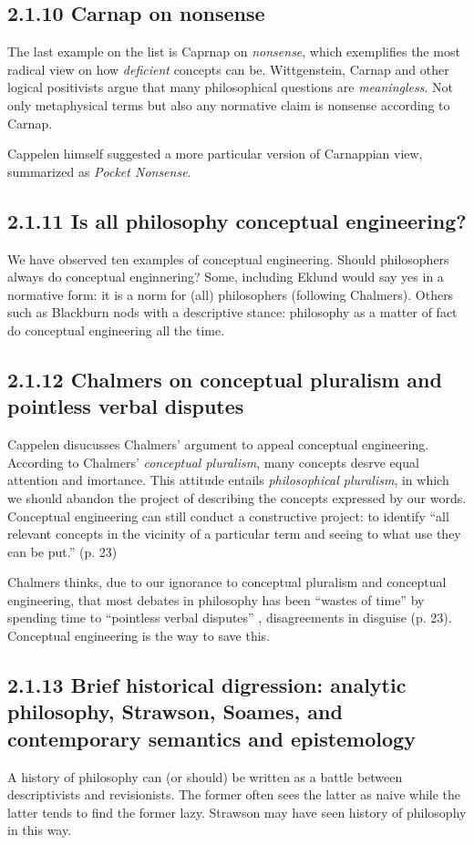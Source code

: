\documentclass[
10pt, %
a4paper, %
twocolumn, %
landscape %
]{article}
\begin{document}
\subsection*{2.1.10 Carnap on nonsense}
The last example on the list is Caprnap on \emph{nonsense}, which exemplifies the most radical view on how \emph{deficient} concepts can be. Wittgenstein, Carnap and other logical positivists argue that many philosophical questions are \emph{meaningless}. Not only metaphysical terms but also any normative claim is nonsense according to Carnap.

Cappelen himself suggested a more particular version of  Carnappian view, summarized as \emph{Pocket Nonsense}.

\subsection*{2.1.11 Is all philosophy conceptual engineering?}
We have observed ten examples of conceptual engineering. Should philosophers always do conceptual enginnering?
Some, including Eklund would say yes in a normative form: it is a norm for (all) philosophers (following Chalmers).
Others such as Blackburn nods with a descriptive stance: philosophy as a matter of fact do conceptual engineering all the time.

\subsection*{2.1.12 Chalmers on conceptual pluralism and pointless verbal disputes}
Cappelen disucusses Chalmers' argument to appeal conceptual engineering.
According to Chalmers' \emph{conceptual pluralism}, many concepts desrve equal attention and imortance. This attitude entails \emph{philosophical pluralism}, in which we should abandon the project of describing the concepts expressed by our words.
Conceptual engineering can still conduct a constructive project: to identify ``all relevant concepts in the vicinity of a particular term and seeing to what use they can be put.'' (p. 23)

Chalmers thinks, due to our ignorance to conceptual pluralism and conceptual engineering, that most debates in philosophy has been ``wastes of time'' by spending time to ``pointless verbal disputes'' , disagreements in disguise (p. 23).
Conceptual engineering is the way to save this.

\subsection*{2.1.13 Brief historical digression: analytic philosophy, Strawson, Soames, and contemporary semantics and epistemology}
A history of philosophy can (or should) be written as a battle between descriptivists and revisionists.
The former often sees the latter as naive while the latter tends to find the former lazy.
Strawson may have seen history of philosophy in this way.
\end{document}
